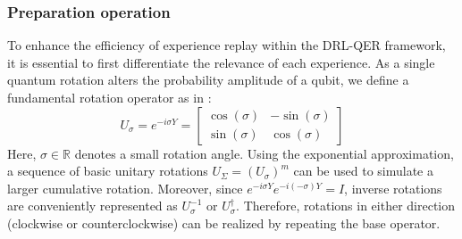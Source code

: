 \documentclass[journal]{IEEEtran}
\begin{document}
\subsubsection{Preparation operation} \label{preparation_operation}
To enhance the efficiency of experience replay within the DRL-QER framework, it is essential to first differentiate the relevance of each experience. As a single quantum rotation alters the probability amplitude of a qubit, we define a fundamental rotation operator as in \cite{9357477}:
\begin{equation} 
U_{\sigma }=e^{-{i} \sigma Y}=\left [{\begin{array}{cc}{\cos \left ({\sigma }\right)} & {-\sin \left ({\sigma }\right)} \\ {\sin \left ({\sigma }\right)} & {\cos \left ({\sigma }\right)}\end{array}}\right]
\label{prep_phase_oper} 
\end{equation}
Here, $\sigma \in \mathbb{R}$ denotes a small rotation angle. Using the exponential approximation, a sequence of basic unitary rotations $U_{\Sigma} = (U_{\sigma})^m$ can be used to simulate a larger cumulative rotation. Moreover, since $e^{-i\sigma Y} e^{-i(-\sigma) Y} = I$, inverse rotations are conveniently represented as $U_{\sigma}^{-1}$ or $U_{\sigma}^{\dagger}$. Therefore, rotations in either direction (clockwise or counterclockwise) can be realized by repeating the base operator.
\end{document}
